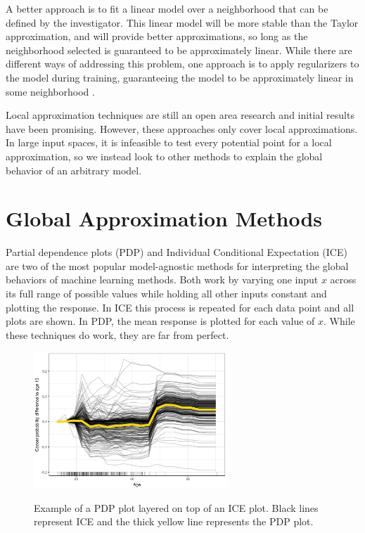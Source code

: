 A better approach is to fit a linear model over a neighborhood that can be defined by the investigator. This linear model will be more stable than the Taylor approximation, and will provide better approximations, so long as the neighborhood selected is guaranteed to be approximately linear. While there are different ways of addressing this problem, one approach is to apply regularizers to the model during training, guaranteeing the model to be approximately linear in some neighborhood \citep{Plumb2019RegularizingInterpretability}.

Local approximation techniques are still an open area research \citep{Ribeiro2016WhyClassifier, Plumb2018ModelExplanations} and initial results have been promising. However, these approaches only cover local approximations. In large input spaces, it is infeasible to test every potential point for a local approximation, so we instead look to other methods to explain the global behavior of an arbitrary model. 

\section{Global Approximation Methods}

Partial dependence plots (PDP) and Individual Conditional Expectation (ICE) are two of the most popular model-agnostic methods for interpreting the global behaviors of machine learning methods. Both work by varying one input $x$ across its full range of possible values while holding all other inputs constant and plotting the response. In ICE this process is repeated for each data point and all plots are shown. In PDP, the mean response is plotted for each value of $x$. While these techniques do work, they are far from perfect. 

\begin{figure}[t]
    \centering
    \caption{Example of a PDP plot layered on top of an ICE plot. Black lines represent ICE and the thick yellow line represents the PDP plot. \citep{Molnar2019InterpretableLearning}}
    \includegraphics[width=0.65\textwidth]{fig/ice}
    \label{fig:ice}
\end{figure}


